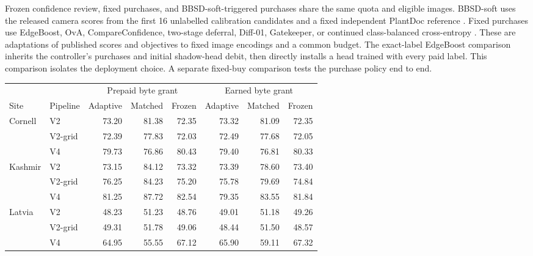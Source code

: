 Frozen confidence review, fixed purchases, and BBSD-soft-triggered purchases share the same quota and eligible images. BBSD-soft uses the released camera scores from the first 16 unlabelled calibration candidates and a fixed independent PlantDoc reference \cite{bbsd}. Fixed purchases use EdgeBoost, OvA, CompareConfidence, two-stage deferral, Diff-01, Gatekeeper, or continued class-balanced cross-entropy \cite{edgeboost,ova,cc,mao,jit,gate}. These are adaptations of published scores and objectives to fixed image encodings and a common budget. The exact-label EdgeBoost comparison inherits the controller's purchases and initial shadow-head debit, then directly installs a head trained with every paid label. This comparison isolates the deployment choice. A separate fixed-buy comparison tests the purchase policy end to end.

\begin{center}\small\setlength{\tabcolsep}{4.4pt}
\begin{tabular}{@{}llrrrrrr@{}}\toprule
&&\multicolumn{3}{c}{Prepaid byte grant}&\multicolumn{3}{c}{Earned byte grant}\\
\cmidrule(lr){3-5}\cmidrule(lr){6-8}
Site & Pipeline & Adaptive & Matched & Frozen & Adaptive & Matched & Frozen\\\midrule
Cornell & V2 &73.20&81.38&72.35&73.32&81.09&72.35\\
 & V2-grid &72.39&77.83&72.03&72.49&77.68&72.05\\
 & V4 &79.73&76.86&80.43&79.40&76.81&80.33\\\addlinespace
Kashmir & V2 &73.15&84.12&73.32&73.39&78.60&73.40\\
 & V2-grid &76.25&84.23&75.20&75.78&79.69&74.84\\
 & V4 &81.25&87.72&82.54&79.35&83.55&81.84\\\addlinespace
Latvia & V2 &48.23&51.23&48.76&49.01&51.18&49.26\\
 & V2-grid &49.31&51.78&49.06&48.44&51.50&48.57\\
 & V4 &64.95&55.55&67.12&65.90&59.11&67.32\\\bottomrule
\end{tabular}
\end{center}

